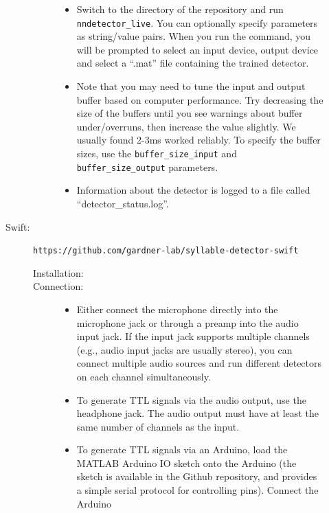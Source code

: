 \documentclass[10pt,letterpaper]{article}
\begin{document}
\begin{description}
\begin{description}
\begin{description}
      \begin{itemize}
      \item Switch to the directory of the repository and run {\tt nndetector\_live}. You
      can optionally specify parameters as string/value pairs. When you run the command,
      you will be prompted to select an input device, output device and select a ``.mat''
      file containing the trained detector.
      \item Note that you may need to tune the input and output buffer based on computer 
      performance. Try decreasing the size of the buffers until you see warnings about buffer
      under/overruns, then increase the value slightly. We usually found 2-3ms worked reliably.
      To specify the buffer sizes, use the {\tt buffer\_size\_input} and 
      {\tt buffer\_size\_output} parameters.
      \item Information about the detector is logged to a file called ``detector\_status.log''.
      \end{itemize}
    \end{description}
  \item[Swift:] {\tt https://github.com/gardner-lab/syllable-detector-swift}
    \begin{description}
    \item[Installation:]\hfill
    \item[Connection:]\hfill
      \begin{itemize}
      \item Either connect the microphone directly into the microphone jack or through a 
      preamp into the audio input jack. If the input jack supports multiple channels (e.g., 
      audio input jacks are usually stereo), you can connect multiple audio sources and run 
      different detectors on each channel simultaneously.
      \item To generate TTL signals via the audio output, use the headphone jack. The 
      audio output must have at least the same number of channels as the input.
      \item To generate TTL signals via an Arduino, load the MATLAB Arduino IO sketch 
      onto the Arduino (the sketch is available in the Github repository, and provides a 
      simple serial protocol for controlling pins). Connect the Arduino 

\end{itemize}
\end{description}
\end{description}
\end{description}
\end{document}
